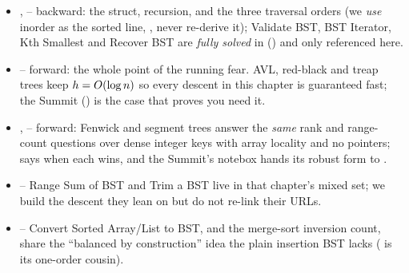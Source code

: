 
\begin{itemize}[nosep, leftmargin=1.4em]
  \item {},  -- backward: the  struct, recursion, and the three
        traversal orders (we \emph{use} inorder as the sorted line, , never
        re-derive it); Validate BST, BST Iterator, Kth Smallest and Recover BST are \emph{fully solved}
        in  () and only referenced here.
  \item {} -- forward: the whole point of the running fear. AVL, red-black and treap trees keep
        $h=O(\log n)$ so every descent in this chapter is guaranteed fast; the Summit
        () is the case that proves you need it.
  \item {},  -- forward: Fenwick and segment trees answer the \emph{same} rank and
        range-count questions over dense integer keys with array locality and no pointers; 
        says when each wins, and the Summit's notebox hands its robust form to .
  \item {} -- Range Sum of BST and Trim a BST live in that chapter's mixed set; we build the
        descent they lean on but do not re-link their URLs.
  \item {} -- Convert Sorted Array/List to BST, and the merge-sort inversion count, share the
        ``balanced by construction'' idea the plain insertion BST lacks ( is its
        one-order cousin).
\end{itemize}

